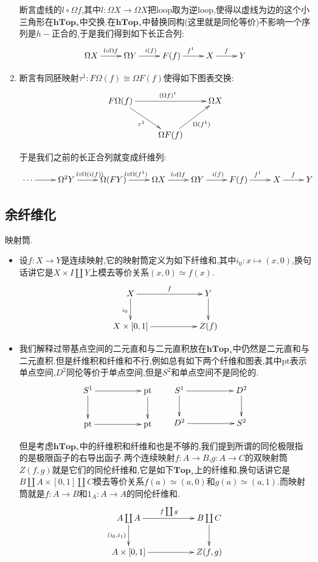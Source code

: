\begin{enumerate}
    断言虚线的$l\circ\Omega f$,其中$l:\Omega X\to\Omega X$把loop取为逆loop,使得以虚线为边的这个小三角形在$\textbf{hTop}_*$中交换.在$\textbf{hTop}_*$中替换同构(这里就是同伦等价)不影响一个序列是$h-$正合的,于是我们得到如下长正合列:
    $$\xymatrix{\Omega X\ar[r]^{l\circ\Omega f}&\Omega Y\ar[r]^{i(f)}&F(f)\ar[r]^{f^1}&X\ar[r]^f&Y}$$
    \item 断言有同胚映射$\tau^1:F\Omega(f)\cong\Omega F(f)$使得如下图表交换:
    $$\xymatrix{F\Omega(f)\ar[rr]^{(\Omega f)^1}\ar[dr]_{\tau^1}&&\Omega X\\&\Omega F(f)\ar[ur]_{\Omega(f^1)}&}$$
    
    于是我们之前的长正合列就变成纤维列:
    $$\xymatrix{\cdots\ar[r]&\Omega^2Y\ar[r]^{l\circ\Omega(i(f))}&\Omega(FY)\ar[r]^{l\circ\Omega(f^1)}&\Omega X\ar[r]^{l\circ\Omega f}&\Omega Y\ar[r]^{i(f)}&F(f)\ar[r]^{f^1}&X\ar[r]^f&Y}$$
\end{enumerate}
\newpage
\subsection{余纤维化}

映射筒.
\begin{itemize}
	\item 设$f:X\to Y$是连续映射,它的映射筒定义为如下纤维和,其中$i_0:x\mapsto (x,0)$,换句话讲它是$X\times I\coprod Y$上模去等价关系$(x,0)\simeq f(x)$.
	$$\xymatrix{X\ar[rr]^f\ar[d]_{i_0}&&Y\ar[d]\\X\times[0,1]\ar[rr]&&Z(f)}$$
	\item 我们解释过带基点空间的二元直和与二元直积放在$\textbf{hTop}_*$中仍然是二元直和与二元直积.但是纤维积和纤维和不行,例如总有如下两个纤维和图表,其中$\mathrm{pt}$表示单点空间,$D^2$同伦等价于单点空间,但是$S^2$和单点空间不是同伦的.
	$$\xymatrix{S^1\ar[rr]\ar[d]&&\mathrm{pt}\ar[d]\\\mathrm{pt}\ar[rr]&&\mathrm{pt}}\qquad\xymatrix{S^1\ar[rr]\ar[d]&&D^2\ar[d]\\D^2\ar[rr]&&S^2}$$
	
	但是考虑$\textbf{hTop}_*$中的纤维积和纤维和也是不够的,我们提到所谓的同伦极限指的是极限函子的右导出函子.两个连续映射$f:A\to B$,$g:A\to C$的双映射筒$Z(f,g)$就是它们的同伦纤维和,它是如下$\textbf{Top}_*$上的纤维和,换句话讲它是$B\coprod A\times[0,1]\coprod C$模去等价关系$f(a)\simeq(a,0)$和$g(a)\simeq(a,1)$.而映射筒就是$f:A\to B$和$1_A:A\to A$的同伦纤维和.
	$$\xymatrix{A\coprod A\ar[rr]^{f\coprod g}\ar[d]_{(i_0,i_1)}&&B\coprod C\ar[d]\\A\times[0,1]\ar[rr]&&Z(f,g)}$$
\end{itemize}

